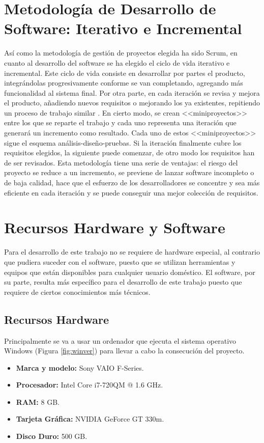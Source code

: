 \section{Metodología de Desarrollo de Software: Iterativo e Incremental}
Así como la metodología de gestión de proyectos elegida ha sido Scrum, en cuanto al desarrollo del software se ha elegido el ciclo de vida iterativo e incremental. Este ciclo de vida consiste en desarrollar por partes el producto, integrándolas progresivamente conforme se van completando, agregando más funcionalidad al sistema final. Por otra parte, en cada iteración se revisa y mejora el producto, añadiendo nuevos requisitos o mejorando los ya existentes, repitiendo un proceso de trabajo similar \cite{proyectosagiles.org}. En cierto modo, se crean <<miniproyectos>> entre los que se reparte el trabajo y cada uno representa una iteración que generará un incremento como resultado. Cada uno de estos <<miniproyectos>> sigue el esquema análisis-diseño-pruebas. Si la iteración finalmente cubre los requisitos elegidos, la siguiente puede comenzar, de otro modo los requisitos han de ser revisados. Esta metodología tiene una serie de ventajas: el riesgo del proyecto se reduce a un incremento, se previene de lanzar software incompleto o de baja calidad, hace que el esfuerzo de los desarrolladores se concentre y sea más eficiente en cada iteración y se puede conseguir una mejor colección de requisitos.

\section{Recursos Hardware y Software}
Para el desarrollo de este trabajo no se requiere de hardware especial, al contrario que pudiera suceder con el software, puesto que se utilizan herramientas y equipos que están disponibles para cualquier usuario doméstico. El software, por su parte, resulta más específico para el desarrollo de este trabajo puesto que requiere de ciertos conocimientos más técnicos.

\newpage

\subsection{Recursos Hardware}
Principalmente se va a usar un ordenador que ejecuta el sistema operativo Windows (Figura \ref{fig:winver}) para llevar a cabo la consecución del proyecto.

\begin{itemize}
	\item \textbf{Marca y modelo:} Sony VAIO F-Series.
	\item \textbf{Procesador:} Intel\textregistered{ } Core\texttrademark{ } i7-720QM @ 1.6 \acf{GHz}.
	\item \textbf{RAM:} 8 \acs{GB}.
	\item \textbf{Tarjeta Gráfica:} NVIDIA GeForce GT 330m.
	\item \textbf{Disco Duro:} 500 \acs{GB}.
\end{itemize}

